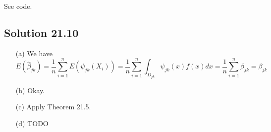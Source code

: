 See code.


\subsection*{Solution 21.10}

\begin{enumerate}
    \item[(a)] We have
        \begin{equation*}
            E(\hat{\beta}_{jk}) = \frac{1}{n} \sum_{i = 1}^n E(\psi_{jk}(X_i))
                = \frac{1}{n} \sum_{i = 1}^n \int_{D_{jk}} \psi_{jk}(x) f(x) dx
                = \frac{1}{n} \sum_{i = 1}^n \beta_{jk}
                = \beta_{jk}
        \end{equation*}
    \item[(b)] Okay.
    \item[(c)] Apply Theorem 21.5.
    \item[(d)] TODO
\end{enumerate}
